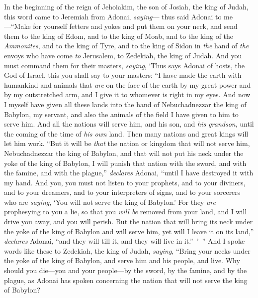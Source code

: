 \begin{biblechapter} %
 In the beginning of the reign of Jehoiakim, the son of Josiah, the king of Judah, this word came to Jeremiah from Adonai, \textit{saying}—
\verse thus said Adonai to me—“Make for yourself fetters and yokes and put them on your neck,
\verse and send them to the king of Edom, and to the king of Moab, and to the king of the \textit{Ammonites}, and to the king of Tyre, and to the king of Sidon in \textit{the} hand of \textit{the} envoys who have come \textit{to} Jerusalem, to Zedekiah, the king of Judah.
\verse And you must command them for their masters, \textit{saying}, ‘Thus says Adonai of hosts, the God of Israel, this you shall say to your masters:
\verse “I have made the earth with humankind and animals that \textit{are} on the face of the earth by my great power and by my outstretched arm, and I give it to whomever is right in my eyes.
\verse And now I myself have given all these lands into the hand of Nebuchadnezzar the king of Babylon, my servant, and also the animals of the field I have given to him to serve him.
\verse And all the nations will serve him, and his son, and \textit{his grandson}, until the coming of the time of \textit{his own} land. Then many nations and great kings will let him work.
\verse “But it will be \textit{that} the nation or kingdom that will not serve him, Nebuchadnezzar the king of Babylon, and that will not put his neck under the yoke of the king of Babylon, I will punish that nation with the sword, and with the famine, and with the plague,” \textit{declares} Adonai, “until I have destroyed it with my hand.
\verse And you, you must not listen to your prophets, and to your diviners, and to your dreamers, and to your interpreters of signs, and to your sorcerers who are \textit{saying}, ‘You will not serve the king of Babylon.’
\verse For they \textit{are} prophesying to you a lie, so that you \textit{will be} removed from your land, and I will drive you away, and you will perish.
\verse But the nation that will bring its neck under the yoke of the king of Babylon and will serve him, yet will I leave it on its land,” \textit{declares} Adonai, “and they will till it, and they will live in it.” ’ ”
\verse And I spoke words like these to Zedekiah, the king of Judah, \textit{saying}, “Bring your necks under the yoke of the king of Babylon, and serve him and his people, and live.
\verse Why should you die—you and your people—by the sword, by the famine, and by the plague, as Adonai has spoken concerning the nation that will not serve the king of Babylon?

\end{biblechapter}
